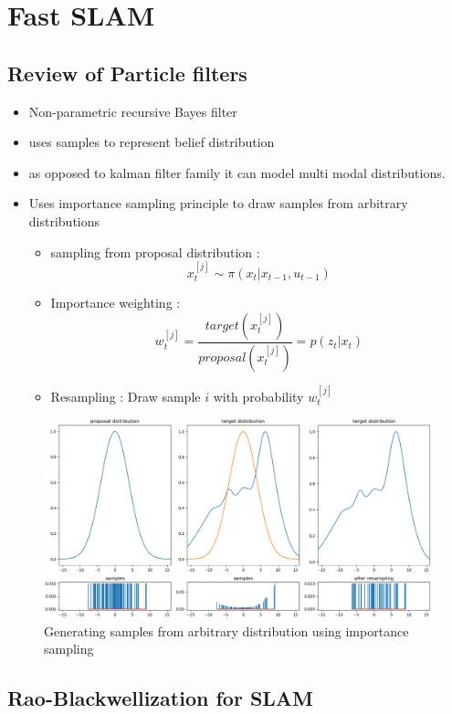 \documentclass{article}
\begin{document}
\section{Fast SLAM}
\subsection{Review of Particle filters}
\begin{itemize}
        \item Non-parametric recursive Bayes filter
        \item uses samples to represent belief distribution
        \item as opposed to kalman filter family it can model multi modal distributions. 
        \item Uses importance sampling principle to draw samples from arbitrary distributions
            \begin{itemize}
                \item sampling from proposal distribution : 
                    $$x_t^{[j]} \sim \pi(x_t|x_{t-1},u_{t-1})$$
                \item Importance weighting :
                    $$ w_t^{[j]} = \frac{target(x_t^{[j]})}{proposal(x_t^{[j]})} = p(z_t|x_t) $$
                \item Resampling : Draw sample $i$ with probability $w_t^{[j]}$
            \end{itemize}
\end{itemize}
\begin{figure}
    \includegraphics[width = \linewidth]{./importance_sampling.png}
    \caption{Generating samples from arbitrary distribution using importance sampling}
\end{figure}
\subsection{Rao-Blackwellization for SLAM}
\end{document}
